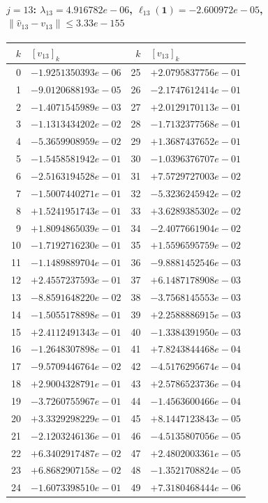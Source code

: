 \documentclass[11pt]{article}
\begin{document}
\paragraph{$j = 13$: $\lambda_{13} = 4.916782e-06$, \quad $\ell_{13}(\mathbf{1}) = -2.600972e-05$, \quad $\|\hat v_{13} - v_{13}\| \leq 3.33e-155$}
\begin{center}
{\footnotesize
\begin{tabular}{r@{\;\;}l@{\quad}r@{\;\;}l}
\toprule
$k$ & $[v_{13}]_k$ & $k$ & $[v_{13}]_k$ \\
\midrule
0 & $-1.9251350393e-06$ & 25 & $+2.0795837756e-01$ \\
1 & $-9.0120688193e-05$ & 26 & $-2.1747612414e-01$ \\
2 & $-1.4071545989e-03$ & 27 & $+2.0129170113e-01$ \\
3 & $-1.1313434202e-02$ & 28 & $-1.7132377568e-01$ \\
4 & $-5.3659908959e-02$ & 29 & $+1.3687437652e-01$ \\
5 & $-1.5458581942e-01$ & 30 & $-1.0396376707e-01$ \\
6 & $-2.5163194528e-01$ & 31 & $+7.5729727003e-02$ \\
7 & $-1.5007440271e-01$ & 32 & $-5.3236245942e-02$ \\
8 & $+1.5241951743e-01$ & 33 & $+3.6289385302e-02$ \\
9 & $+1.8094865039e-01$ & 34 & $-2.4077661904e-02$ \\
10 & $-1.7192716230e-01$ & 35 & $+1.5596595759e-02$ \\
11 & $-1.1489889704e-01$ & 36 & $-9.8881452546e-03$ \\
12 & $+2.4557237593e-01$ & 37 & $+6.1487178908e-03$ \\
13 & $-8.8591648220e-02$ & 38 & $-3.7568145553e-03$ \\
14 & $-1.5055178898e-01$ & 39 & $+2.2588886915e-03$ \\
15 & $+2.4112491343e-01$ & 40 & $-1.3384391950e-03$ \\
16 & $-1.2648307898e-01$ & 41 & $+7.8243844468e-04$ \\
17 & $-9.5709446764e-02$ & 42 & $-4.5176295674e-04$ \\
18 & $+2.9004328791e-01$ & 43 & $+2.5786523736e-04$ \\
19 & $-3.7260755967e-01$ & 44 & $-1.4563600466e-04$ \\
20 & $+3.3329298229e-01$ & 45 & $+8.1447123843e-05$ \\
21 & $-2.1203246136e-01$ & 46 & $-4.5135807056e-05$ \\
22 & $+6.3402917487e-02$ & 47 & $+2.4802003361e-05$ \\
23 & $+6.8682907158e-02$ & 48 & $-1.3521708824e-05$ \\
24 & $-1.6073398510e-01$ & 49 & $+7.3180468444e-06$ \\
\bottomrule
\end{tabular}
}
\end{center}
\end{document}
